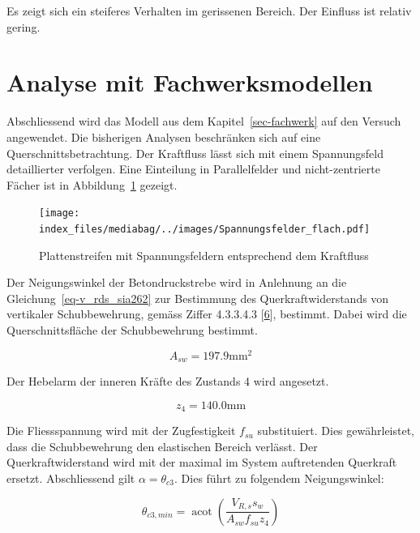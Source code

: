\documentclass[
  12pt,
  letterpaper,
  egregdoesnotlikesansseriftitles]{scrreprt}
\begin{document}
Es zeigt sich ein steiferes Verhalten im gerissenen Bereich. Der
Einfluss ist relativ gering.

\hypertarget{analyse-mit-fachwerksmodellen}{%
\section{Analyse mit
Fachwerksmodellen}\label{analyse-mit-fachwerksmodellen}}

Abschliessend wird das Modell aus dem Kapitel~\ref{sec-fachwerk} auf den
Versuch angewendet. Die bisherigen Analysen beschränken sich auf eine
Querschnittsbetrachtung. Der Kraftfluss lässt sich mit einem
Spannungsfeld detaillierter verfolgen. Eine Einteilung in Parallelfelder
und nicht-zentrierte Fächer ist in
Abbildung~\ref{fig-spannungsfelder_flach} gezeigt.

\begin{figure}[H]

{\centering \texttt{[image: index\_files/mediabag/../images/Spannungsfelder\_flach.pdf]}

}

\caption{\label{fig-spannungsfelder_flach}Plattenstreifen mit
Spannungsfeldern entsprechend dem Kraftfluss}

\end{figure}

Der Neigungswinkel der Betondruckstrebe wird in Anlehnung an die
Gleichung~\ref{eq-v_rds_sia262} zur Bestimmung des Querkraftwiderstands
von vertikaler Schubbewehrung, gemäss Ziffer 4.3.3.4.3
{[}\protect\hyperlink{ref-SIA2013a}{6}{]}, bestimmt. Dabei wird die
Querschnittsfläche der Schubbewehrung bestimmt.

\begin{equation}A_{s w} = 197.9 \text{mm}^{2}\end{equation}

Der Hebelarm der inneren Kräfte des Zustands 4 wird angesetzt.

\begin{equation}z_{4} = 140.0 \text{mm}\end{equation}

Die Fliessspannung wird mit der Zugfestigkeit \(f_{su}\) substituiert.
Dies gewährleistet, dass die Schubbewehrung den elastischen Bereich
verlässt. Der Querkraftwiderstand wird mit der maximal im System
auftretenden Querkraft ersetzt. Abschliessend gilt
\(\alpha = \theta_{c3}\). Dies führt zu folgendem Neigungswinkel:

\begin{equation}\theta_{c3,min} = \operatorname{acot}{\left(\frac{V_{R,s} s_{w}}{A_{s w} f_{su} z_{4}} \right)}\end{equation}
\end{document}
